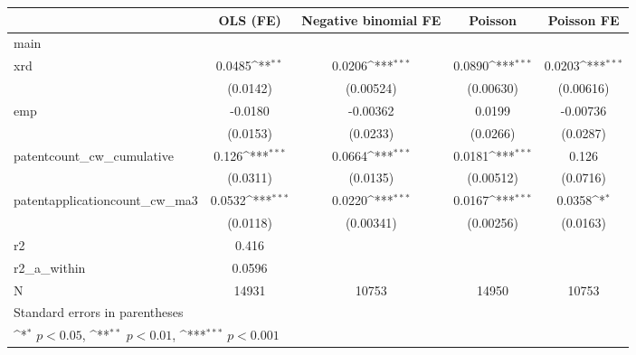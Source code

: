 {
\def\sym#1{\ifmmode^{#1}\else\(^{#1}\)\fi}
\begin{tabular}{l*{4}{c}}
\hline\hline
            &\multicolumn{1}{c}{OLS (FE)}&\multicolumn{1}{c}{Negative binomial FE}&\multicolumn{1}{c}{Poisson}&\multicolumn{1}{c}{Poisson FE}\\
\hline
main        &                     &                     &                     &                     \\
xrd         &      0.0485\sym{**} &      0.0206\sym{***}&      0.0890\sym{***}&      0.0203\sym{***}\\
            &    (0.0142)         &   (0.00524)         &   (0.00630)         &   (0.00616)         \\
[1em]
emp         &     -0.0180         &    -0.00362         &      0.0199         &    -0.00736         \\
            &    (0.0153)         &    (0.0233)         &    (0.0266)         &    (0.0287)         \\
[1em]
patentcount\_cw\_cumulative&       0.126\sym{***}&      0.0664\sym{***}&      0.0181\sym{***}&       0.126         \\
            &    (0.0311)         &    (0.0135)         &   (0.00512)         &    (0.0716)         \\
[1em]
patentapplicationcount\_cw\_ma3&      0.0532\sym{***}&      0.0220\sym{***}&      0.0167\sym{***}&      0.0358\sym{*}  \\
            &    (0.0118)         &   (0.00341)         &   (0.00256)         &    (0.0163)         \\
\hline
r2          &       0.416         &                     &                     &                     \\
r2\_a\_within &      0.0596         &                     &                     &                     \\
N           &       14931         &       10753         &       14950         &       10753         \\
\hline\hline
\multicolumn{5}{l}{\footnotesize Standard errors in parentheses}\\
\multicolumn{5}{l}{\footnotesize \sym{*} \(p<0.05\), \sym{**} \(p<0.01\), \sym{***} \(p<0.001\)}\\
\end{tabular}
}
